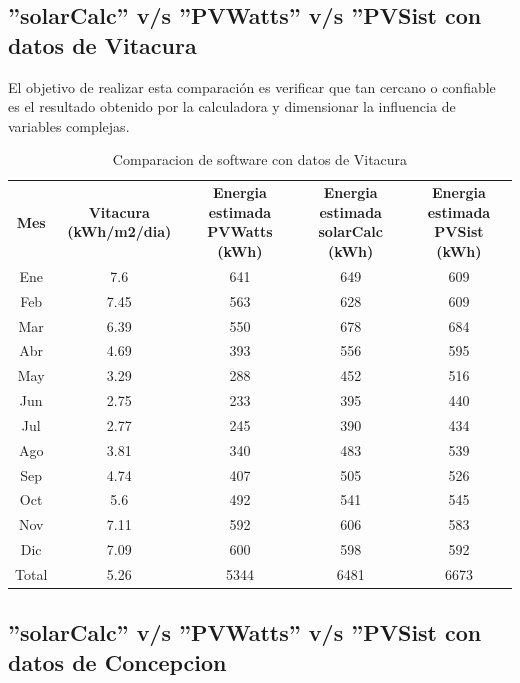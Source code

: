 \subsection{''solarCalc'' v/s ''PVWatts'' v/s ''PVSist con datos de Vitacura}
El objetivo de realizar esta comparación es verificar que tan cercano o confiable es el resultado obtenido por la calculadora y dimensionar la influencia de variables complejas.

\begin{table}[h!]
\caption{Comparacion de software con datos de Vitacura}
\begin{tabular}{|c|c|c|c|c|}
        \hline
	\textbf{Mes}&\textbf{Vitacura (kWh/m2/dia)}&\textbf{Energia estimada PVWatts (kWh)}&\textbf{Energia estimada solarCalc (kWh)}&\textbf{Energia estimada PVSist (kWh)}\\
	Ene&	7.6&	641&	649&	609\\
        \hline
	Feb&	7.45&	563&	628&	609\\
        \hline
	Mar&	6.39&	550&	678&	684\\
        \hline
	Abr&	4.69&	393&	556&	595\\
        \hline
	May&	3.29&	288&	452&	516\\
        \hline
	Jun&	2.75&	233&	395&	440\\
        \hline
	Jul&	2.77&	245&	390&	434\\
        \hline
	Ago&	3.81&	340&	483&	539\\
        \hline
	Sep&	4.74&	407&	505&	526\\
        \hline
	Oct&	5.6&	492&	541&	545\\
        \hline
	Nov&	7.11&	592&	606&	583\\
        \hline
	Dic&	7.09&	600&	598&	592\\
        \hline
	Total&	5.26&	5344&	6481&	6673\\
        \hline
\end{tabular}
\end{table}

\subsection{''solarCalc'' v/s ''PVWatts'' v/s ''PVSist con datos de Concepcion}

